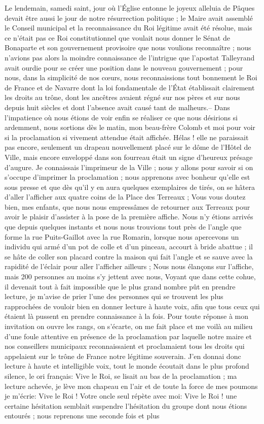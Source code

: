 \documentclass[11pt,a4paper]{report}
\begin{document}
Le lendemain, samedi saint, jour où l'Église entonne le joyeux alleluia de Pâques devait être aussi le jour de notre résurrection politique ; le Maire avait assemblé le Conseil municipal et la reconnaissance du Roi légitime avait été résolue, mais ce n'était pas ce Roi constitutionnel que voulait nous donner le Sénat de Bonaparte et son gouvernement provisoire que nous voulions reconnaître ; nous n'avions pas alors la moindre connaissance de l'intrigue que l'apostat Talleyrand avait ourdie pour se créer une position dans le nouveau gouvernement ; pour nous, dans la simplicité de nos cœurs, nous reconnaissions tout bonnement le Roi de France et de Navarre dont la loi fondamentale de l'État établissait clairement les droits au trône, dont les ancêtres avaient régné sur nos pères et sur nous depuis huit siècles et dont l'absence avait causé tant de malheurs.-- Dans l'impatience où nous étions de voir enfin se réaliser ce que nous désirions si ardemment, nous sortions dès le matin, mon beau-frère Colomb et moi pour voir si la proclamation si vivement attendue était affichée. Hélas ! elle ne paraissait pas encore, seulement un drapeau nouvellement placé sur le dôme de l'Hôtel de Ville, mais encore enveloppé dans son fourreau était un signe d'heureux présage d'augure. Je connaissais l'imprimeur de la Ville ; nous y allons pour savoir si on s'occupe d'imprimer la proclamation ; nous apprenons avec bonheur qu'elle est sous presse et que dès qu'il y en aura quelques exemplaires de tirés, on se hâtera d'aller l'afficher aux quatre coins de la Place des Terreaux ; Vous vous doutez bien, mes enfants, que nous nous empressâmes de retourner aux Terreaux pour avoir le plaisir d'assister à la pose de la première affiche. Nous n'y étions arrivés que depuis quelques instants et nous nous trouvions tout près de l'angle que forme la rue Puits-Gaillot avec la rue Romarin, lorsque nous apercevons un individu qui armé d'un pot de colle et d'un pinceau, accourt à bride abattue ; il se hâte de coller son placard contre la maison qui fait l'angle et se sauve avec la rapidité de l'éclair pour aller l'afficher ailleurs ; Nous nous élançons sur l'affiche, mais 200 personnes au moins s'y jettent avec nous, Voyant que dans cette cohue, il devenait tout à fait impossible que le plus grand nombre pût en prendre lecture, je m'avise de prier l'une des personnes qui se trouvent les plus rapprochées de vouloir bien en donner lecture à haute voix, afin que tous ceux qui étaient là pussent en prendre connaissance à la fois. Pour toute réponse à mon invitation on ouvre les rangs, on s'écarte, on me fait place et me voilà au milieu d'une foule attentive en présence de la proclamation par laquelle notre maire et nos conseillers municipaux reconnaissaient et proclamaient tous les droits qui appelaient sur le trône de France notre légitime souverain. J'en donnai donc lecture à haute et intelligible voix, tout le monde écoutait dans le plus profond silence, le ori français: Vive le Roi, se lisait au bas de la proclamation ; ma lecture achevée, je lève mon chapeau en l'air et de toute la force de mes poumons je m'écrie: Vive le Roi ! Votre oncle seul répète avec moi: Vive le Roi ! une certaine hésitation semblait suspendre l'hésitation du groupe dont nous étions entourés ; nous reprenons une seconde fois et plus 
\end{document}
